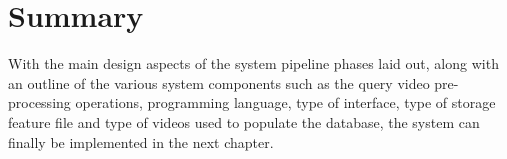 \section{Summary}

With the main design aspects of the system pipeline phases laid out, along with an outline of the various system components such as the query video pre-processing operations, programming language, type of interface, type of storage feature file and type of videos used to populate the database, the system can finally be implemented in the next chapter.
